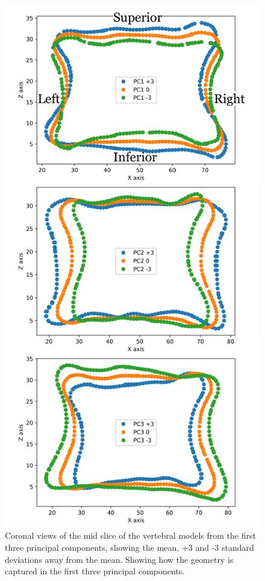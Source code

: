 \begin{figure}[p]
  \centering
  \includegraphics[width=.65\textwidth]{Chapters/Chapter_PCA_images/PC1_2_3_CoronalSlice.pdf}
  \caption{Coronal views of the mid slice of the vertebral models from the first three principal components, showing the mean, +3 and -3 standard deviations away from the mean. Showing how the geometry is captured in the first three principal components.}
  \label{fig:PC1_2_3_CoronalSlice}
\end{figure}



